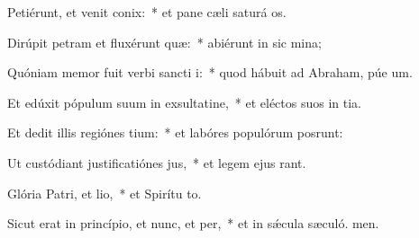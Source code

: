 \item Petiérunt, et venit conix:~* et pane cæli saturá os.
\item Dirúpit petram et fluxérunt quæ:~* abiérunt in sic mina;
\item Quóniam memor fuit verbi sancti i:~* quod hábuit ad Abraham, púe um.
\item Et edúxit pópulum suum in exsultatine,~* et eléctos suos in tia.
\item Et dedit illis regiónes tium:~* et labóres populórum posrunt:
\item Ut custódiant justificatiónes jus,~* et legem ejus rant.
\item Glória Patri, et lio,~* et Spirítu to.
\item Sicut erat in princípio, et nunc, et per,~* et in sǽcula sæculó. men.
